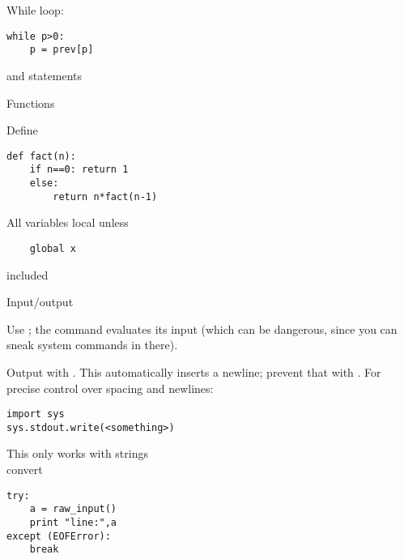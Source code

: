 While loop:
\begin{verbatim}
while p>0:
    p = prev[p]
\end{verbatim}

 and  statements

 {Functions}

Define
\begin{verbatim}
def fact(n):
    if n==0: return 1
    else:
        return n*fact(n-1)
\end{verbatim}
All variables local unless
\begin{verbatim}
    global x
\end{verbatim}
included

 {Input/output}

Use ; the  command evaluates its
input (which can be dangerous, since you can sneak system commands
in there).

Output with . This automatically inserts a newline; prevent
that with . For precise control over spacing and newlines:
\begin{verbatim}
import sys
sys.stdout.write(<something>)
\end{verbatim}
This only works with strings\\
convert 

\begin{verbatim}
try:
    a = raw_input()
    print "line:",a
except (EOFError):
    break
\end{verbatim}
